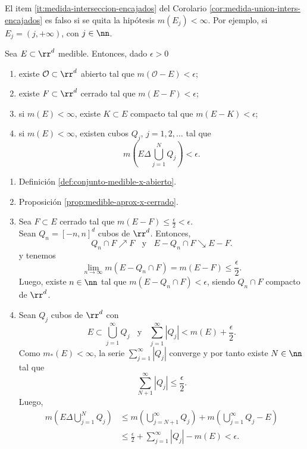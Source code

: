\begin{observacion}{}
El item \ref{it:medida-interseccion-encajados} del Corolario \ref{cor:medida-union-inters-encajados} es  falso si se quita la hip\'otesis $m(E_j)<\infty$. 
Por ejemplo, si $E_j=(j, +\infty)$, con $j\in \nn$.
\end{observacion}

\begin{teorema}{}
Sea $E\subset \rr^d$ medible. Entonces, dado $\epsilon>0$ 
\begin{enumerate}
    \item existe $\mathcal{O}\subset \rr^d$ abierto tal que $m(\mathcal{O}-E)<\epsilon$;
    \item existe $F\subset \rr^d$ cerrado tal que $m(E-F)<\epsilon$;
    \item si $m(E)<\infty$, existe $K \subset E$ compacto tal que 
    $m(E-K)<\epsilon$;
    \item si $m(E)<\infty$, existen cubos $Q_j$, $j=1,2,\dots$ tal que 
    \[
    m\left(E\Delta \bigcup\limits_{j=1}^N Q_j\right)<\epsilon.
    \]
\end{enumerate}
\end{teorema}

\begin{demo}
\begin{enumerate}
    \item Definici\'on \ref{def:conjunto-medible-x-abierto}.
    \item Proposici\'on \ref{prop:medible-aprox-x-cerrado}.
    \item Sea $F\subset E$ cerrado tal que 
    $m(E-F)\leq \frac{\epsilon}{2}<\epsilon$. \\
    Sean $Q_n=[-n,n]^d$ cubos de $\rr^d$. Entonces, 
    \[
    Q_n\cap F \nearrow F \;\; \mbox{ y }\;\; E-Q_n\cap F \searrow E-F.
    \]
 y tenemos
    \[
    \lim\limits_{n \to \infty}m\left(E-Q_n\cap F\right)=m(E-F)\leq \frac{\epsilon}{2}.
    \]
    Luego, existe $n\in \nn$ tal que $m(E-Q_n\cap F)<\epsilon$, 
    siendo $Q_n\cap F$ compacto de $\rr^d$.
    \item Sean $Q_j$ cubos de $\rr^d$ con  
    \[
    E\subset \bigcup\limits_{j=1}^{\infty} Q_j\;\; \mbox{ y }\;\;
    \sum\limits_{j=1}^{\infty} |Q_j|<m(E)+\frac{\epsilon}{2}.
    \]
    Como $m_{*}(E)<\infty$, la serie $\sum\limits_{j=1}^{\infty} |Q_j|$
    converge y por tanto existe $N\in \nn$ tal que 
    \[\sum\limits_{N+1}^{\infty} |Q_j|\leq \frac{\epsilon}{2}.\]
    Luego, 
    \[
    \begin{split}
    m\left(E\Delta \bigcup\limits_{j=1}^N Q_j\right)&\leq 
    m\left(\bigcup\limits_{j=N+1}^{\infty} Q_j\right)+m\left(\bigcup\limits_{j=1}^{\infty} Q_j-E\right)
    \\
    &\leq 
    \frac{\epsilon}{2}+\sum\limits_{j=1}^{\infty}|Q_j|-m(E)<
    \epsilon.
    \end{split}
    \]
    \end{enumerate}
\end{demo}

